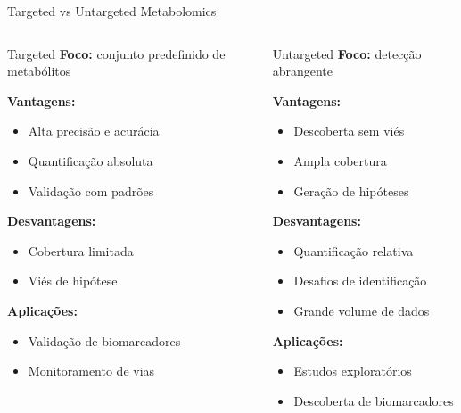 \begin{frame}{Targeted vs Untargeted Metabolomics}
\begin{columns}
\begin{block}{Targeted}
\textbf{Foco:} conjunto predefinido de metabólitos

\vspace{0.2cm}

\textbf{Vantagens:}
\begin{itemize}
    \item Alta precisão e acurácia
    \item Quantificação absoluta
    \item Validação com padrões
\end{itemize}

\vspace{0.2cm}

\textbf{Desvantagens:}
\begin{itemize}
    \item Cobertura limitada
    \item Viés de hipótese
\end{itemize}

\vspace{0.2cm}

\textbf{Aplicações:}
\begin{itemize}
    \item Validação de biomarcadores
    \item Monitoramento de vias
\end{itemize}
\end{block}

\begin{block}{Untargeted}
\textbf{Foco:} detecção abrangente

\vspace{0.2cm}

\textbf{Vantagens:}
\begin{itemize}
    \item Descoberta sem viés
    \item Ampla cobertura
    \item Geração de hipóteses
\end{itemize}

\vspace{0.2cm}

\textbf{Desvantagens:}
\begin{itemize}
    \item Quantificação relativa
    \item Desafios de identificação
    \item Grande volume de dados
\end{itemize}

\vspace{0.2cm}

\textbf{Aplicações:}
\begin{itemize}
    \item Estudos exploratórios
    \item Descoberta de biomarcadores
\end{itemize}
\end{block}
\end{columns}
\end{frame}

